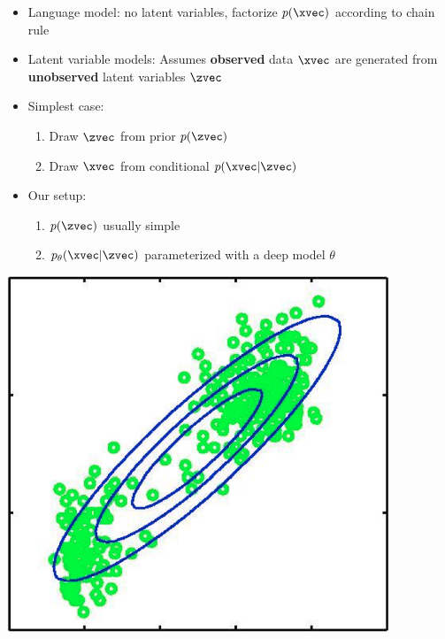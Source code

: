 \begin{frame}
  \begin{center}
   \end{center}
\begin{itemize}
\item Language model: no latent variables, factorize $p(\xvec)$ according to chain rule
\item Latent variable models: Assumes \textbf{observed} data $\xvec$ are generated from \textbf{unobserved} latent variables $\zvec$
\item Simplest case:
\begin{enumerate}
\item Draw $\zvec$ from prior $p(\zvec)$ 
\item Draw $\xvec$ from conditional $p(\xvec | \zvec)$ 
\end{enumerate}
\item Our setup:
\begin{enumerate}
\item $p(\zvec)$ usually simple
\item $p_\theta(\xvec | \zvec)$  parameterized with a deep model $\theta$
 \end{enumerate}
\end{itemize}
\end{frame}

\begin{frame}
  \begin{center}
   \end{center}
   \center
\includegraphics[scale=0.5]{gmm1}
\end{frame}


